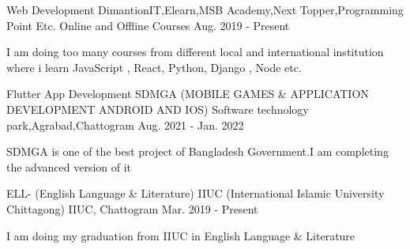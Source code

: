 

\begin{cventries}
  \cventry
    {Web Development} %
    {DimantionIT,Elearn,MSB Academy,Next Topper,Programming Point Etc.} %
    {Online and Offline Courses} %
    {Aug. 2019 - Present} %
    {
      \begin{cvitems} %
        \item {I am doing too many courses from different local and international institution where i learn JavaScript , React, Python, Django , Node etc.}
      \end{cvitems}
    }
  \cventry
    {Flutter App Development} %
    {SDMGA (MOBILE GAMES \& APPLICATION DEVELOPMENT ANDROID AND IOS)} %
    {Software technology park,Agrabad,Chattogram} %
    {Aug. 2021 - Jan. 2022} %
    {
      \begin{cvitems} %
        \item {SDMGA is one of the best project of Bangladesh Government.I am completing the advanced version of it}
      \end{cvitems}
    }
  \cventry
    {ELL- (English Language \& Literature)} %
    {IIUC (International Islamic University Chittagong)} %
    {IIUC, Chattogram} %
    {Mar. 2019 - Present} %
    {
      \begin{cvitems} %
        \item {I am doing my graduation from IIUC in English Language \& Literature}
      \end{cvitems}
    }
\end{cventries}
